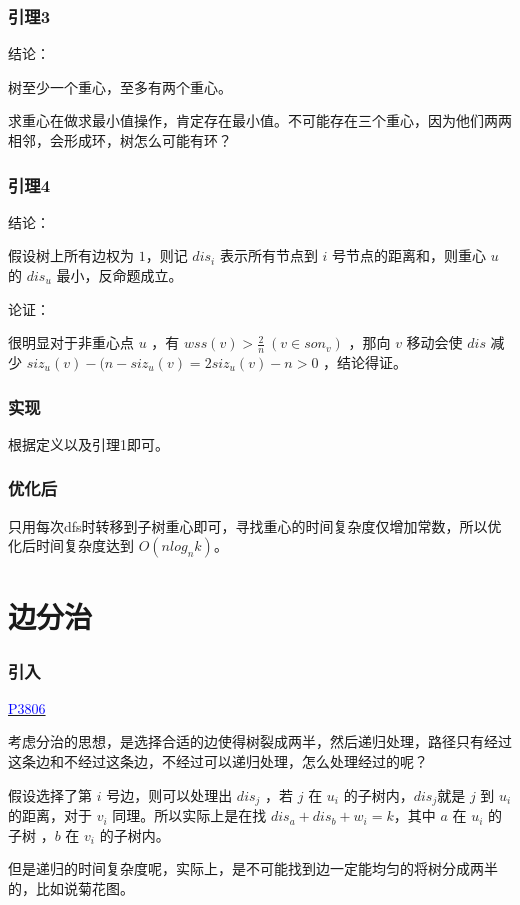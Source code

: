 \documentclass[UTF8]{ctexbeamer}
\begin{document}
        \begin{frame}
            \frametitle{引理3}
            结论：

            树至少一个重心，至多有两个重心。

            \hspace*{\fill}

            求重心在做求最小值操作，肯定存在最小值。不可能存在三个重心，因为他们两两相邻，会形成环，树怎么可能有环？
        \end{frame}

        \begin{frame}
            \frametitle{引理4}
            结论：

            假设树上所有边权为 $1$，则记 $dis_i $ 表示所有节点到 $i$ 号节点的距离和，则重心 $u$ 的 $dis_u$ 最小，反命题成立。

            \hspace*{\fill}

            论证：

            很明显对于非重心点 $u$ ，有 $wss(v) > \frac 2 n~ (v \in son_v) $ ，那向 $v$ 移动会使 $dis$ 减少 $siz_u(v)-(n-siz_u(v)=2siz_u(v)-n>0$ ，结论得证。
        \end{frame}

        \begin{frame}
            \frametitle{实现}
            根据定义以及引理1即可。
        \end{frame}

        \begin{frame}
            \frametitle{优化后}
            只用每次dfs时转移到子树重心即可，寻找重心的时间复杂度仅增加常数，所以优化后时间复杂度达到 $O(nlog_nk)$。
        \end{frame}
    \section{边分治}
        \begin{frame}
            \frametitle{引入}
            \href{https://www.luogu.com.cn/problem/P3806}{\textcolor{blue}{P3806}}

            考虑分治的思想，是选择合适的边使得树裂成两半，然后递归处理，路径只有经过这条边和不经过这条边，不经过可以递归处理，怎么处理经过的呢？

            假设选择了第 $i$ 号边，则可以处理出 $dis_j$ ，若 $j$ 在 $u_i$ 的子树内，$dis_j$就是 $j$ 到 $u_i$ 的距离，对于 $v_i$ 同理。所以实际上是在找 $dis_a+dis_b+w_i=k$，其中 $a$ 在 $u_i$ 的子树 ，$b$ 在 $v_i$ 的子树内。

            但是递归的时间复杂度呢，实际上，是不可能找到边一定能均匀的将树分成两半的，比如说菊花图。

        \end{frame}
\end{document}
